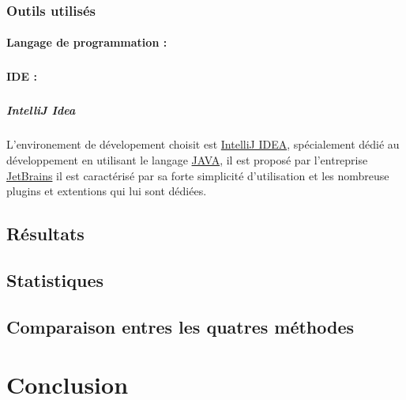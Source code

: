 \documentclass[12pt]{report}
\begin{document}
\subsection{Outils utilisés}
\subsubsection{Langage de programmation : }
\paragraph{}

\subsubsection{IDE : }
\paragraph{}
\paragraph{IntelliJ Idea} L'environement de dévelopement choisit est \href{URL}{IntelliJ IDEA}, spécialement dédié au développement en utilisant le langage \href{URL}{JAVA}, il est proposé par l'entreprise \href{https://www.jetbrains.com}{JetBrains} il est caractérisé par sa forte simplicité d'utilisation et les nombreuse plugins et extentions qui lui sont dédiées.

\section{Résultats}\label{tests}
\paragraph{}
\section{Statistiques}
\paragraph{}
\section{Comparaison entres les quatres méthodes}
\paragraph{}

\chapter{Conclusion}
\listoffigures


\end{document}
